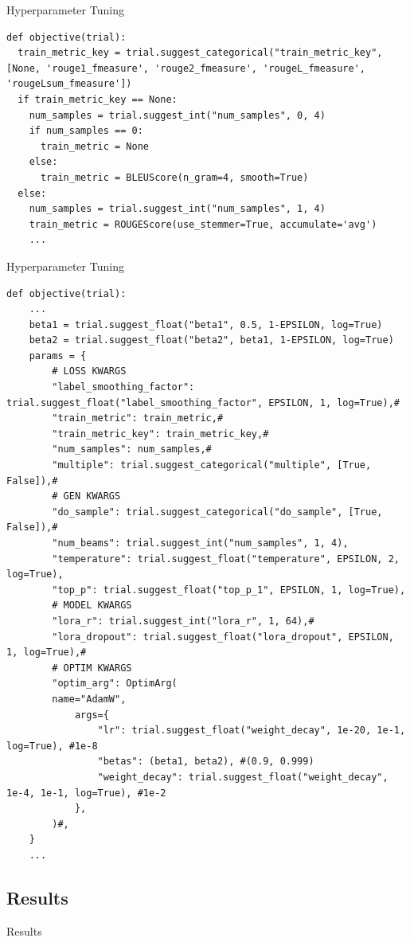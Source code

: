 \documentclass[aspectratio=169,xcolor=dvipsnames]{beamer}
\begin{document}
\begin{frame}[fragile]{Hyperparameter Tuning}
\begin{verbatim}
def objective(trial):
  train_metric_key = trial.suggest_categorical("train_metric_key", [None, 'rouge1_fmeasure', 'rouge2_fmeasure', 'rougeL_fmeasure', 'rougeLsum_fmeasure'])
  if train_metric_key == None:
    num_samples = trial.suggest_int("num_samples", 0, 4)
    if num_samples == 0:
      train_metric = None
    else:
      train_metric = BLEUScore(n_gram=4, smooth=True)
  else:
    num_samples = trial.suggest_int("num_samples", 1, 4)
    train_metric = ROUGEScore(use_stemmer=True, accumulate='avg')
    ...
\end{verbatim}
\end{frame}
\begin{frame}[fragile]{Hyperparameter Tuning}
\begin{verbatim}
def objective(trial):   
    ...
    beta1 = trial.suggest_float("beta1", 0.5, 1-EPSILON, log=True)
    beta2 = trial.suggest_float("beta2", beta1, 1-EPSILON, log=True)
    params = {
        # LOSS KWARGS
        "label_smoothing_factor": trial.suggest_float("label_smoothing_factor", EPSILON, 1, log=True),#
        "train_metric": train_metric,#
        "train_metric_key": train_metric_key,#
        "num_samples": num_samples,#
        "multiple": trial.suggest_categorical("multiple", [True, False]),#
        # GEN KWARGS
        "do_sample": trial.suggest_categorical("do_sample", [True, False]),#
        "num_beams": trial.suggest_int("num_samples", 1, 4),
        "temperature": trial.suggest_float("temperature", EPSILON, 2, log=True),
        "top_p": trial.suggest_float("top_p_1", EPSILON, 1, log=True),
        # MODEL KWARGS
        "lora_r": trial.suggest_int("lora_r", 1, 64),#
        "lora_dropout": trial.suggest_float("lora_dropout", EPSILON, 1, log=True),#
        # OPTIM KWARGS
        "optim_arg": OptimArg(
        name="AdamW",
            args={
                "lr": trial.suggest_float("weight_decay", 1e-20, 1e-1, log=True), #1e-8
                "betas": (beta1, beta2), #(0.9, 0.999)
                "weight_decay": trial.suggest_float("weight_decay", 1e-4, 1e-1, log=True), #1e-2
            },
        )#,
    }
    ...
\end{verbatim}
\end{frame}
\subsection{Results}
\begin{frame}{Results}
\end{frame}
\end{document}
